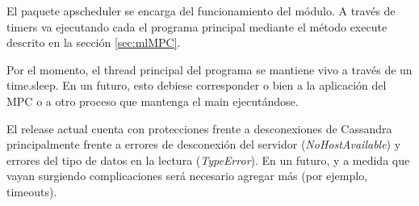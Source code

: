 \documentclass{article}
\begin{document}
El paquete apscheduler se encarga del funcionamiento del módulo. A través de timers va ejecutando cada  el programa principal mediante el método execute descrito en la sección \ref{sec:mlMPC}.

Por el momento, el thread principal del programa se mantiene vivo a través de un time.sleep. En un futuro, esto debiese corresponder o bien a la aplicación del MPC o a otro proceso que mantenga el main ejecutándose.

El release actual cuenta con protecciones frente a desconexiones de Cassandra principalmente frente a errores de desconexión del servidor (\emph{NoHostAvailable}) y errores del tipo de datos en la lectura (\emph{TypeError}). En un futuro, y a medida que vayan surgiendo complicaciones será necesario agregar más (por ejemplo, timeouts).
\end{document}
